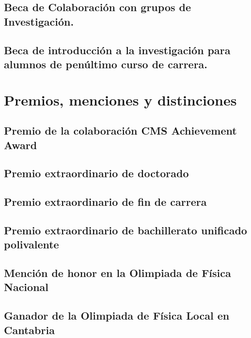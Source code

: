 \documentclass[a4paper, 11pt, twoside, openright]{report}
\begin{document}
\subsection{Beca de Colaboración con grupos de Investigación.}

\subsection{Beca de introducción a la investigación para alumnos de penúltimo curso de carrera.}



\section{Premios, menciones y distinciones}
\subsection{Premio de la colaboración CMS Achievement Award}

\subsection{Premio extraordinario de doctorado}

\subsection{Premio extraordinario de fin de carrera}

\subsection{Premio extraordinario de bachillerato unificado polivalente}

\subsection{Mención de honor en la Olimpiada de Física Nacional}

\subsection{Ganador de la Olimpiada de Física Local en Cantabria}

\end{document}
